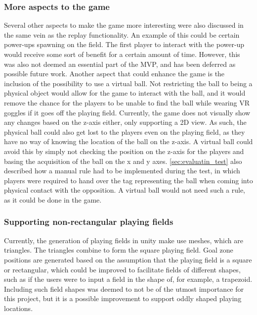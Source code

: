 \subsubsection{More aspects to the game}
Several other aspects to make the game more interesting were also discussed in the same vein as the replay functionality.
An example of this could be certain power-ups spawning on the field.
The first player to interact with the power-up would receive some sort of benefit for a certain amount of time.
However, this was also not deemed an essential part of the MVP, and has been deferred as possible future work.
Another aspect that could enhance the game is the inclusion of the possibility to use a virtual ball.
Not restricting the ball to being a physical object would allow for the game to interact with the ball, and it would remove the chance for the players to be unable to find the ball while wearing VR goggles if it goes off the playing field.
Currently, the game does not visually show any changes based on the z-axis either, only supporting a 2D view.
As such, the physical ball could also get lost to the players even on the playing field, as they have no way of knowing the location of the ball on the z-axis.
A virtual ball could avoid this by simply not checking the position on the z-axis for the players and basing the acquisition of the ball on the x and y axes.
\autoref{sec:evaluatin_test} also described how a manual rule had to be implemented during the test, in which players were required to hand over the tag representing the ball when coming into physical contact with the opposition.
A virtual ball would not need such a rule, as it could be done in the game.

\subsubsection{Supporting non-rectangular playing fields}
Currently, the generation of playing fields in unity make use meshes, which are triangles.
The triangles combine to form the square playing field.
Goal zone positions are generated based on the assumption that the playing field is a square or rectangular, which could be improved to facilitate fields of different shapes, such as if the users were to input a field in the shape of, for example, a trapezoid.
Including such field shapes was deemed to not be of the utmost importance for this project, but it is a possible improvement to support oddly shaped playing locations.


